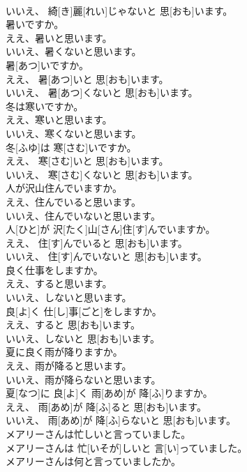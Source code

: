 \documentclass[8pt]{extreport}
\begin{document}
\begin{CJK}{UTF8}{min}
\\	いいえ、 綺[き]麗[れい]じゃないと 思[おも]います。
\\	暑いですか。 
\\	ええ、暑いと思います。 
\\	いいえ、暑くないと思います。	
\\	暑[あつ]いですか。 
\\	ええ、 暑[あつ]いと 思[おも]います。 
\\	いいえ、 暑[あつ]くないと 思[おも]います。
\\	冬は寒いですか。 
\\	ええ、寒いと思います。 
\\	いいえ、寒くないと思います。	
\\	冬[ふゆ]は 寒[さむ]いですか。 
\\	ええ、 寒[さむ]いと 思[おも]います。 
\\	いいえ、 寒[さむ]くないと 思[おも]います。
\\	人が沢山住んでいますか。 
\\	ええ、住んでいると思います。 
\\	いいえ、住んでいないと思います。	
\\	人[ひと]が 沢[たく]山[さん]住[す]んでいますか。 
\\	ええ、 住[す]んでいると 思[おも]います。 
\\	いいえ、 住[す]んでいないと 思[おも]います。
\\	良く仕事をしますか。 
\\	ええ、すると思います。 
\\	いいえ、しないと思います。	
\\	良[よ]く 仕[し]事[ごと]をしますか。 
\\	ええ、すると 思[おも]います。 
\\	いいえ、しないと 思[おも]います。
\\	夏に良く雨が降りますか。 
\\	ええ、雨が降ると思います。 
\\	いいえ、雨が降らないと思います。	
\\	夏[なつ]に 良[よ]く 雨[あめ]が 降[ふ]りますか。 
\\	ええ、 雨[あめ]が 降[ふ]ると 思[おも]います。 
\\	いいえ、 雨[あめ]が 降[ふ]らないと 思[おも]います。
\\	メアリーさんは忙しいと言っていました。	
\\	メアリーさんは 忙[いそが]しいと 言[い]っていました。
\\	メアリーさんは何と言っていましたか。	

\end{CJK}
\end{document}
